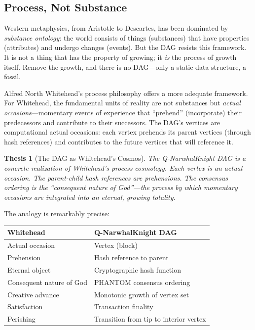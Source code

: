 \documentclass[12pt,a4paper]{article}
\theoremstyle{philosophical}
\newtheorem{thesis}{Thesis}
\begin{document}
\subsection{Process, Not Substance}

Western metaphysics, from Aristotle to Descartes, has been dominated by \emph{substance ontology}: the world consists of things (substances) that have properties (attributes) and undergo changes (events). But the DAG resists this framework. It is not a thing that has the property of growing; it \emph{is} the process of growth itself. Remove the growth, and there is no DAG---only a static data structure, a fossil.

Alfred North Whitehead's process philosophy offers a more adequate framework. For Whitehead, the fundamental units of reality are not substances but \emph{actual occasions}---momentary events of experience that ``prehend'' (incorporate) their predecessors and contribute to their successors. The DAG's vertices are computational actual occasions: each vertex prehends its parent vertices (through hash references) and contributes to the future vertices that will reference it.

\begin{thesis}[The DAG as Whitehead's Cosmos]
\label{thesis:whitehead}
The Q-NarwhalKnight DAG is a concrete realization of Whitehead's process cosmology. Each vertex is an actual occasion. The parent-child hash references are prehensions. The consensus ordering is the ``consequent nature of God''---the process by which momentary occasions are integrated into an eternal, growing totality.
\end{thesis}

The analogy is remarkably precise:

\begin{center}
\begin{tabular}{l|l}
\textbf{Whitehead} & \textbf{Q-NarwhalKnight DAG} \\
\hline
Actual occasion & Vertex (block) \\
Prehension & Hash reference to parent \\
Eternal object & Cryptographic hash function \\
Consequent nature of God & PHANTOM consensus ordering \\
Creative advance & Monotonic growth of vertex set \\
Satisfaction & Transaction finality \\
Perishing & Transition from tip to interior vertex
\end{tabular}
\end{center}
\end{document}
